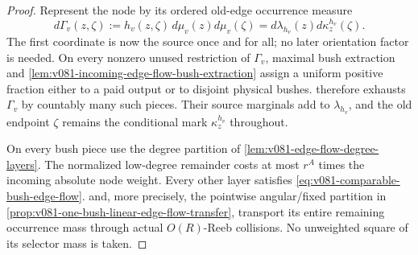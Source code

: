 \documentclass[10pt]{article}
\begin{document}
\begin{proof}
Represent the node by its ordered old-edge occurrence measure
\[
d\Gamma_v(z,\zeta)
:=h_v(z,\zeta)\,d\mu_v(z)d\mu_v(\zeta)
=d\lambda_{h_v}(z)d\kappa_z^{h_v}(\zeta).
\]
The first coordinate is now the source once and for all; no later orientation factor is needed.
On every nonzero unused restriction of \(\Gamma_v\), maximal bush extraction and
\cref{lem:v081-incoming-edge-flow-bush-extraction} assign a uniform positive fraction either to a
paid output or to disjoint physical bushes.   therefore exhausts \(\Gamma_v\) by countably many
such pieces.  Their source marginals add to \(\lambda_{h_v}\), and the old endpoint \(\zeta\)
remains the conditional mark \(\kappa_z^{h_v}\) throughout.

On every bush piece use the degree partition of
\cref{lem:v081-edge-flow-degree-layers}.  The normalized low-degree remainder costs at most \(r^A\)
times the incoming absolute node weight.  Every other layer satisfies
\eqref{eq:v081-comparable-bush-edge-flow}.   and, more precisely, the pointwise
angular/fixed partition in
\cref{prop:v081-one-bush-linear-edge-flow-transfer}, transport its entire remaining occurrence
mass through actual \(O(R)\)-Reeb collisions.  No unweighted square of its selector mass is taken.


\end{proof}
\end{document}
